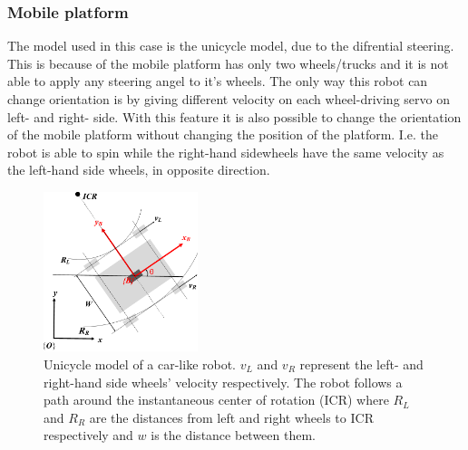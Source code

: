 \subsubsection{Mobile platform}
The model used in this case is the unicycle model, due to the difrential steering. This is because of the mobile platform has only two wheels/trucks and it is not able to apply any steering angel to it's wheels. The only way this robot can change orientation is by giving different velocity on each wheel-driving servo on left- and right- side. With this feature it is also possible to change the orientation of the mobile platform without changing the position of the platform. I.e. the robot is able to spin while the right-hand sidewheels have the same velocity as the left-hand side wheels, in opposite direction. 

\begin{figure}[h!]
\centering
\includegraphics[width=0.4\textwidth]{sections/assets/car-unicycle.png}
\caption{Unicycle model of a car-like robot. $v_L$ and $v_R$ represent the left- and right-hand side wheels' velocity respectively. The robot follows a path around the instantaneous center of rotation (ICR) where $R_L$ and $R_R$ are the distances from left and right wheels to ICR respectively and $w$ is the distance between them.}
\label{fig:UnicycleModel}
\end{figure} 

